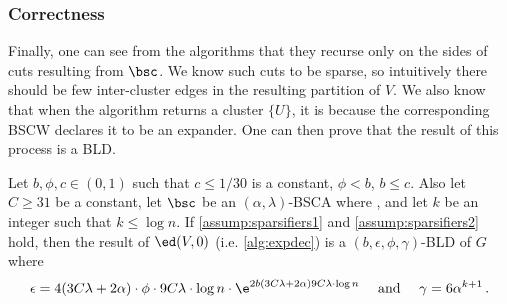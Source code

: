 \subsubsection{Correctness}
\label{subsubsec:correct}

Finally, one can see from the algorithms that they recurse only on the sides of cuts resulting from $\bsc$. We know such cuts to be sparse, so intuitively there should be few inter-cluster edges in the resulting partition of $V$. We also know that when the algorithm returns a cluster $\{U\}$, it is because the corresponding BSCW declares it to be an expander. One can then prove that the result of this process is a BLD.

\begin{lemma}
	\label{lem:bld}
	Let $b, \phi,c \in (0,1)$ such that $c \le 1/30$ is a constant, $\phi < b$, $b \le c$. Also let $C \ge 31$ be a constant, let $\bsc$ be an $(\alpha,\lambda)$-BSCA where , and let $k$ be an integer such that $k \le \log n$. If \cref{assump:sparsifiers1} and \cref{assump:sparsifiers2} hold, then the result of $\ed(V,0)$ (i.e. \cref{alg:expdec}) 
	is a $(b,\epsilon,\phi,\gamma)$-BLD of $G$ where
	\begin{equation*}
		\epsilon = 4 (3C\lambda+2\alpha) \cdot \phi \cdot 9C\lambda \cdot \log n \cdot  \e^{2b (3C\lambda+2\alpha) 9C\lambda \cdot \log n} \quad \text{ and } \quad \gamma = 6 \alpha^{k+1} \, .
	\end{equation*}
\end{lemma}

